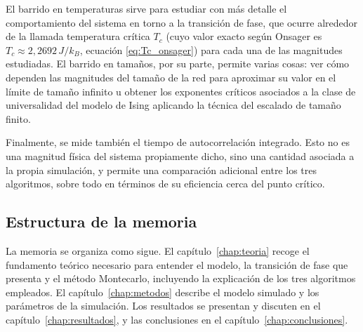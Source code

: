 El barrido en temperaturas sirve para estudiar con más detalle el comportamiento del sistema en torno a la transición de fase, que ocurre alrededor de la llamada temperatura crítica $T_c$ (cuyo valor exacto según Onsager es $T_c \approx 2{,}2692\,J/k_B$, ecuación \eqref{eq:Tc_onsager}) para cada una de las magnitudes estudiadas. El barrido en tamaños, por su parte, permite varias cosas: ver cómo dependen las magnitudes del tamaño de la red para aproximar su valor en el límite de tamaño infinito u obtener los exponentes críticos asociados a la clase de universalidad del modelo de Ising aplicando la técnica del escalado de tamaño finito.

Finalmente, se mide también el tiempo de autocorrelación integrado. Esto no es una magnitud física del sistema propiamente dicho, sino una cantidad asociada a la propia simulación, y permite una comparación adicional entre los tres algoritmos, sobre todo en términos de su eficiencia cerca del punto crítico.

\subsection*{Estructura de la memoria}
La memoria se organiza como sigue. El capítulo~\ref{chap:teoria} recoge el fundamento teórico necesario para entender el modelo, la transición de fase que presenta y el método Montecarlo, incluyendo la explicación de los tres algoritmos empleados. El capítulo~\ref{chap:metodos} describe el modelo simulado y los parámetros de la simulación. Los resultados se presentan y discuten en el capítulo~\ref{chap:resultados}, y las conclusiones en el capítulo~\ref{chap:conclusiones}.